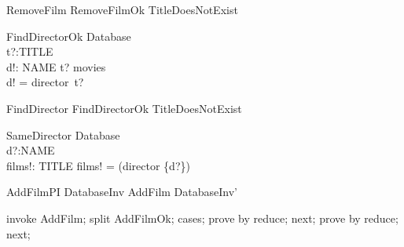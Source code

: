 \begin{zed}
RemoveFilm  RemoveFilmOk \lor TitleDoesNotExist
\end{zed}

\begin{schema}{FindDirectorOk}
\Xi Database \\
t?:TITLE \\
d!: NAME
\where
t? \in movies \\
d! = director~t?
\end{schema}

\begin{zed}
FindDirector  FindDirectorOk \lor TitleDoesNotExist
\end{zed}

\begin{schema}{SameDirector}
\Xi Database \\
d?:NAME \\
films!: \power TITLE
\where
films! = \dom(director \rres \{d?\})
\end{schema}

\begin{theorem}{AddFilmPI}
DatabaseInv \land AddFilm \implies DatabaseInv'
\end{theorem}

\begin{zproof}[AddFilmPI]
invoke AddFilm;
split AddFilmOk;
cases;
prove by reduce;
next;
prove by reduce;
next;
\end{zproof}
